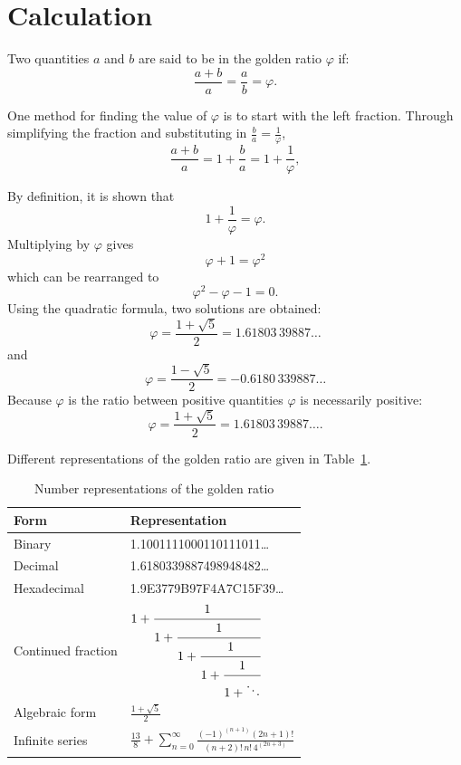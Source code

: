 \section{Calculation}
Two quantities $a$ and $b$ are said to be in the golden ratio $\varphi$ if:
\begin{equation}
 \frac{a+b}{a} = \frac{a}{b} = \varphi.
\end{equation}

One method for finding the value of $\varphi$ is to start with the left fraction. Through simplifying the fraction and substituting in $\frac{b}{a} = \frac{1}{\varphi}$,
\begin{equation}
\frac{a+b}{a} = 1 + \frac{b}{a} = 1 + \frac{1}{\varphi},
\end{equation}

By definition, it is shown that
\begin{equation}
 1 + \frac{1}{\varphi} = \varphi. 
\end{equation}
Multiplying by $\varphi$ gives
\begin{equation*}
\varphi + 1 = \varphi^2
\end{equation*}
which can be rearranged to
\begin{equation*}
{\varphi}^2 - \varphi - 1 = 0.
\end{equation*}
Using the quadratic formula, two solutions are obtained:
\begin{equation*}
\varphi = \frac{1 + \sqrt{5}}{2} = 1.61803\,39887\dots
\end{equation*}
and
\begin{equation*}
\varphi = \frac{1 - \sqrt{5}}{2} = -0.6180\,339887\dots
\end{equation*}
Because $\varphi$ is the ratio between positive quantities $\varphi$ is necessarily positive:
\begin{equation*}
\varphi = \frac{1 + \sqrt{5}}{2} = 1.61803\,39887\dots .
\end{equation*}

Different representations of the golden ratio are given in Table~\ref{tab:goldenratio}.

\begin{table}[hbt!]\centering
\caption{Number representations of the golden ratio}
\label{tab:goldenratio}

\begin{tabular}{|l|l|}
\hline
Form & Representation\\\hline
Binary & 1.1001111000110111011\ldots\\\hline
Decimal & 1.6180339887498948482\ldots\\\hline
Hexadecimal	& 1.9E3779B97F4A7C15F39\ldots\\\hline
Continued fraction & $1 + \cfrac{1}{1 + \cfrac{1}{1 + \cfrac{1}{1 + \cfrac{1}{1 + \ddots}}}}$\\[6ex]\hline
Algebraic form & $\displaystyle\frac{1 + \sqrt{5}}{2}$\\[2ex]\hline
Infinite series & $\displaystyle\frac{13}{8}+\sum_{n=0}^{\infty}\frac{(-1)^{(n+1)}(2n+1)!}{(n+2)!\,n!\,4^{(2n+3)}}$\\[2ex]\hline
\end{tabular}
\end{table}
